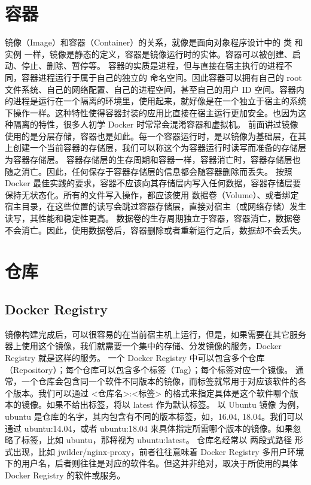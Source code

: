 \documentclass[letterpaper,10pt,english]{sphinxmanual}
\begin{document}
\section{容器}
\label{\detokenize{docker/basic_concept:id4}}
镜像（Image）和容器（Container）的关系，就像是面向对象程序设计中的 类 和 实例 一样，镜像是静态的定义，容器是镜像运行时的实体。容器可以被创建、启动、停止、删除、暂停等。
容器的实质是进程，但与直接在宿主执行的进程不同，容器进程运行于属于自己的独立的 命名空间。因此容器可以拥有自己的 root 文件系统、自己的网络配置、自己的进程空间，甚至自己的用户 ID 空间。容器内的进程是运行在一个隔离的环境里，使用起来，就好像是在一个独立于宿主的系统下操作一样。这种特性使得容器封装的应用比直接在宿主运行更加安全。也因为这种隔离的特性，很多人初学 Docker 时常常会混淆容器和虚拟机。
前面讲过镜像使用的是分层存储，容器也是如此。每一个容器运行时，是以镜像为基础层，在其上创建一个当前容器的存储层，我们可以称这个为容器运行时读写而准备的存储层为容器存储层。
容器存储层的生存周期和容器一样，容器消亡时，容器存储层也随之消亡。因此，任何保存于容器存储层的信息都会随容器删除而丢失。
按照 Docker 最佳实践的要求，容器不应该向其存储层内写入任何数据，容器存储层要保持无状态化。所有的文件写入操作，都应该使用 数据卷（Volume）、或者绑定宿主目录，在这些位置的读写会跳过容器存储层，直接对宿主（或网络存储）发生读写，其性能和稳定性更高。
数据卷的生存周期独立于容器，容器消亡，数据卷不会消亡。因此，使用数据卷后，容器删除或者重新运行之后，数据却不会丢失。


\section{仓库}
\label{\detokenize{docker/basic_concept:id5}}

\subsection{Docker Registry}
\label{\detokenize{docker/basic_concept:docker-registry}}
镜像构建完成后，可以很容易的在当前宿主机上运行，但是，如果需要在其它服务器上使用这个镜像，我们就需要一个集中的存储、分发镜像的服务，Docker Registry 就是这样的服务。
一个 Docker Registry 中可以包含多个仓库（Repository）；每个仓库可以包含多个标签（Tag）；每个标签对应一个镜像。
通常，一个仓库会包含同一个软件不同版本的镜像，而标签就常用于对应该软件的各个版本。我们可以通过 \textless{}仓库名\textgreater{}:\textless{}标签\textgreater{} 的格式来指定具体是这个软件哪个版本的镜像。如果不给出标签，将以 latest 作为默认标签。
以 Ubuntu 镜像 为例，ubuntu 是仓库的名字，其内包含有不同的版本标签，如，16.04, 18.04。我们可以通过 ubuntu:14.04，或者 ubuntu:18.04 来具体指定所需哪个版本的镜像。如果忽略了标签，比如 ubuntu，那将视为 ubuntu:latest。
仓库名经常以 两段式路径 形式出现，比如 jwilder/nginx-proxy，前者往往意味着 Docker Registry 多用户环境下的用户名，后者则往往是对应的软件名。但这并非绝对，取决于所使用的具体 Docker Registry 的软件或服务。
\end{document}
